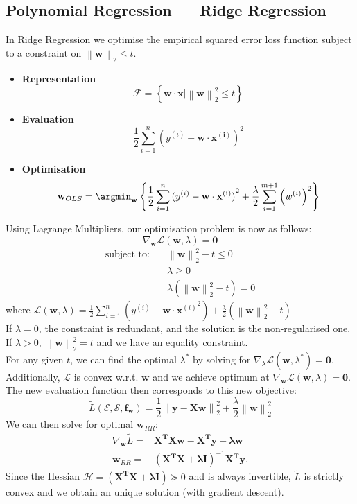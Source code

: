 \subsection{Polynomial Regression --- Ridge Regression}
In Ridge Regression we optimise the empirical squared error loss function subject
to a constraint on $\left\lVert \mathbf{w} \right\rVert_2 \le t$.
\begin{itemize}
  \item \textbf{Representation} \[\mathcal{F}=\left\{ \mathbf{w\cdot x}|{\left\lVert \mathbf{w} \right\rVert}_2^2\le t \right\}\]
  \item \textbf{Evaluation} \[\frac{1}{2}\sum_{i=1}^{n} {(y^{(i)}-\mathbf{w\cdot x^{(i)}})}^{2}\]
  \item \textbf{Optimisation} \[\mathbf{w}_{OLS}=\argmin_\mathbf{w}\left\{
  \frac{1}{2}\sum_{i=1}^{n} {(y^{(i)}-\mathbf{w\cdot x^{(i)}})}^{2} +\frac{\lambda}{2}\sum_{i=1}^{m+1} {\left(w^{(i)}\right)}^2\right\}\]
\end{itemize}
Using Lagrange Multipliers, our optimisation problem is now as follows:
\[\nabla_\mathbf{w}\mathcal{L}(\mathbf{w},\lambda)=\mathbf{0}\]
\begin{align*}
  \text{subject to:}\quad&\left\lVert \mathbf{w} \right\rVert_2^2-t\le 0\\
                         &\lambda\ge 0\\
                         &\lambda\left( \left\lVert \mathbf{w} \right\rVert_2^2 -t \right) =0
\end{align*}
where $\mathcal{L}(\mathbf{w},\lambda)=\frac{1}{2}\sum_{i=1}^{n} \left( y^{(i)}-{\mathbf{w\cdot x}^{(i)}}^{2} \right) +\frac{\lambda}{2}\left( \left\lVert \mathbf{w} \right\rVert_2^2-t \right) $\\
If $\lambda=0$, the constraint is redundant, and the solution is the
non-regularised one. If $\lambda>0$, $\left\lVert \mathbf{w} \right\rVert_2
^2=t$ and we have an equality constraint.\\
For any given $t$, we can find the optimal $\lambda^{*}$ by solving for
$\nabla_\lambda \mathcal{L}(\mathbf{w},\lambda^{*})=\mathbf{0}$. Additionally,
$\mathcal{L}$ is convex w.r.t. $\mathbf{w}$ and we achieve optimum at
$\nabla_\mathbf{w} \mathcal{L}\left( \mathbf{w},\lambda \right) =\mathbf{0}$.
The new evaluation function then corresponds to this new objective:
\[\tilde{L}\left( \mathcal{E},\mathcal{S},\mathbf{f_w} \right)=\frac{1}{2}\left\lVert \mathbf{y-Xw} \right\rVert_2 ^{2}+\frac{\lambda}{2}\left\lVert \mathbf{w} \right\rVert_2 ^{2}\]
We can then solve for optimal $\mathbf{w}_{RR}$:
\begin{align*}
  \nabla_\mathbf{w}\tilde{L}=&\mathbf{X^{T}Xw-X^{T}y+\lambda w}\\
  \mathbf{w}_{RR}=&{\left( \mathbf{X^{T}X+\lambda I} \right) }^{-1}\mathbf{X^{T}y}.
\end{align*}
Since the Hessian $\mathcal{H}=\left( \mathbf{X^{T}X+\lambda I} \right) \succeq
0$ and is always invertible, $\tilde{L}$ is strictly convex and we obtain an
unique solution (with gradient descent).
